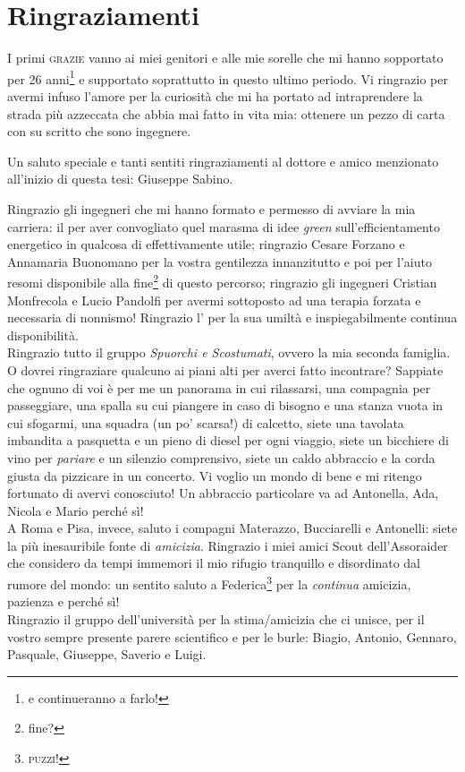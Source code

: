 \chapter*{Ringraziamenti}
\thispagestyle{empty}
I primi \textsc{grazie} vanno ai miei genitori e alle mie sorelle che mi hanno sopportato per 26 anni\footnote{e continueranno a farlo!} e supportato soprattutto in questo ultimo periodo. Vi ringrazio per avermi infuso l'amore per la curiosità che mi ha portato ad intraprendere la strada più azzeccata che abbia mai fatto in vita mia: ottenere un pezzo di carta con su scritto che sono ingegnere.

Un saluto speciale e tanti sentiti ringraziamenti al dottore e amico menzionato all'inizio di questa tesi: Giuseppe Sabino.

Ringrazio gli ingegneri che mi hanno formato e permesso di avviare la mia carriera: il  per aver convogliato quel marasma di idee \emph{green} sull'efficientamento energetico in qualcosa di effettivamente utile;
ringrazio Cesare Forzano e Annamaria Buonomano per la vostra gentilezza innanzitutto e poi per l'aiuto resomi disponibile alla fine\footnote{fine?} di questo percorso;
ringrazio gli ingegneri Cristian Monfrecola e Lucio Pandolfi per avermi sottoposto ad una terapia forzata e necessaria di nonnismo!
Ringrazio l' per la sua umiltà e inspiegabilmente continua disponibilità.\\
Ringrazio tutto il gruppo \emph{Spuorchi e Scostumati}, ovvero la mia seconda famiglia. O dovrei ringraziare qualcuno ai piani alti per averci fatto incontrare? Sappiate che ognuno di voi è per me un panorama in cui rilassarsi, una compagnia per passeggiare, una spalla su cui piangere in caso di bisogno e una stanza vuota in cui sfogarmi, una squadra (un po' scarsa!) di calcetto, siete una tavolata imbandita a pasquetta e un pieno di diesel per ogni viaggio, siete un bicchiere di vino per \emph{pariare} e un silenzio comprensivo, siete un caldo abbraccio e la corda giusta da pizzicare in un concerto. Vi voglio un mondo di bene e mi ritengo fortunato di avervi conosciuto! Un abbraccio particolare va ad Antonella, Ada, Nicola e Mario perché sì!\\
A Roma e Pisa, invece, saluto i compagni Materazzo, Bucciarelli e Antonelli: siete la più inesauribile fonte di \emph{amicizia}.
\newpage
\thispagestyle{empty}
Ringrazio i miei amici Scout dell'Assoraider che considero da tempi immemori il mio rifugio tranquillo e disordinato dal rumore del mondo: un sentito saluto a Federica\footnote{\textsc{puzzi!}} per la \emph{continua} amicizia, pazienza e perché sì!\\Ringrazio il gruppo dell'università per la stima/amicizia che ci unisce, per il vostro sempre presente parere scientifico e per le burle: Biagio, Antonio, Gennaro, Pasquale, Giuseppe, Saverio e Luigi.\\
